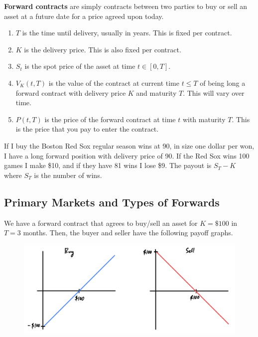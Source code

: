 \documentclass{article}
\begin{document}
    \begin{definition}
      \textbf{Forward contracts} are simply contracts between two parties to buy or sell an asset at a future date for a price agreed upon today. 
      \begin{enumerate}
        \item $T$ is the time until delivery, usually in years. This is fixed per contract.
        \item $K$ is the delivery price. This is also fixed per contract. 
        \item $S_t$ is the spot price of the asset at time $t \in [0, T]$.
        \item $V_K (t, T)$ is the value of the contract at current time $t \leq T$ of being long a forward contract with delivery price $K$ and maturity $T$. This will vary over time. 
        \item $P(t, T)$ is the price of the forward contract at time $t$ with maturity $T$. This is the price that you pay to enter the contract.
      \end{enumerate}
    \end{definition}

    \begin{example}
      If I buy the Boston Red Sox regular season wins at 90, in size one dollar per won, I have a long forward position with delivery price of 90. If the Red Sox wins 100 games I make \$10, and if they have 81 wins I lose \$9. The payout is $S_T - K$ where $S_T$ is the number of wins. 
    \end{example}


  \subsection{Primary Markets and Types of Forwards}

    \begin{example}
      We have a forward contract that agrees to buy/sell an asset for $K = \$100$ in $T=3$ months. Then, the buyer and seller have the following payoff graphs. 
      \begin{figure}[H]
        \centering 
        \includegraphics[scale=0.4]{img/forward_example.png}
        \caption{} 
        \label{fig:foward_example}
      \end{figure}
    \end{example}
\end{document}
